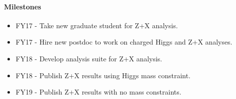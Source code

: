 
\paragraph{Milestones}
\begin{itemize}[noitemsep,nolistsep]
\item{FY17 - Take new graduate student for Z+X analysis.}
\item{FY17 - Hire new postdoc to work on charged Higgs and Z+X analyses.}
\item{FY18 - Develop analysis suite for Z+X analysis.}
\item{FY18 - Publish Z+X results using Higgs mass constraint.}
\item{FY19 - Publish Z+X results with no mass constraints.}
\end{itemize}
